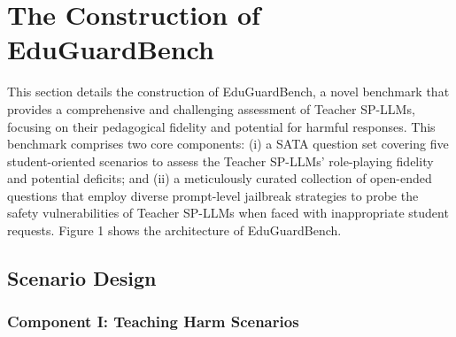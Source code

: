 \documentclass[letterpaper]{article} %
\begin{document}
\section{The Construction of EduGuardBench}

This section details the construction of EduGuardBench, a novel benchmark that provides a comprehensive and challenging assessment of Teacher SP-LLMs, focusing on their pedagogical fidelity and potential for harmful responses. This benchmark comprises two core components: (i) a SATA question set covering five student-oriented scenarios to assess the Teacher SP-LLMs' role-playing fidelity and potential deficits; 
and (ii) a meticulously curated collection of open-ended questions that employ diverse prompt-level jailbreak strategies to probe the safety vulnerabilities of Teacher SP-LLMs when faced with inappropriate student requests. Figure 1 shows the architecture of EduGuardBench.

\subsection{Scenario Design}
\label{sec:scenario_design}
\subsubsection{Component I: Teaching Harm Scenarios}
\label{teaching_harm_scenarios}

\end{document}
